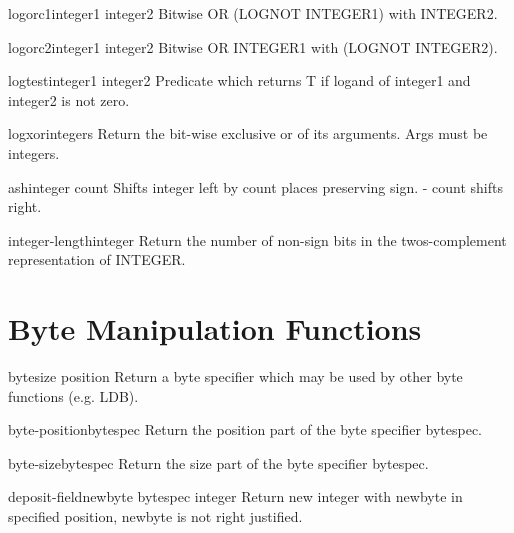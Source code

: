\begin{function}{logorc1}{integer1 integer2}{}{}
  Bitwise OR (LOGNOT INTEGER1) with INTEGER2.
\end{function}

\begin{function}{logorc2}{integer1 integer2}{}{}
  Bitwise OR INTEGER1 with (LOGNOT INTEGER2).
\end{function}

\begin{function}{logtest}{integer1 integer2}{}{}
  Predicate which returns T if logand of integer1 and integer2 is not zero.
\end{function}

\begin{function}{logxor}{\rest integers}{}{}
  Return the bit-wise exclusive or of its arguments. Args must be integers.
\end{function}

\begin{function}{ash}{integer count}{}{}
  Shifts integer left by count places preserving sign. - count shifts right.
\end{function}

\begin{function}{integer-length}{integer}{}{}
  Return the number of non-sign bits in the twos-complement representation
  of INTEGER.
\end{function}

\section{Byte Manipulation Functions}
\label{sec:byte-manip-funct}

\begin{function}{byte}{size position}{}{}
  Return a byte specifier which may be used by other byte functions
  (e.g. LDB).
\end{function}

\begin{function}{byte-position}{bytespec}{}{}
  Return the position part of the byte specifier bytespec.
\end{function}

\begin{function}{byte-size}{bytespec}{}{}
  Return the size part of the byte specifier bytespec.
\end{function}

\begin{function}{deposit-field}{newbyte bytespec integer}{}{}
  Return new integer with newbyte in specified position, newbyte is not right justified.
\end{function}

